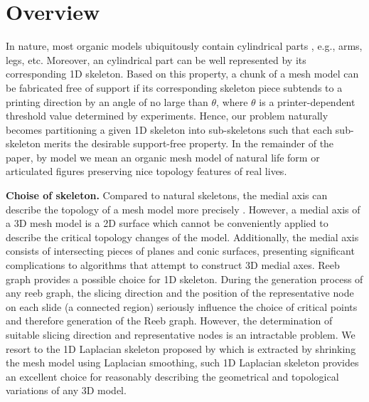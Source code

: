 \section{Overview}

In nature, most organic models ubiquitously contain cylindrical parts \cite{Zhou:2015:GCD}, e.g., arms, legs, etc. Moreover, an cylindrical part can be well represented by its corresponding 1D skeleton. Based on this property, a chunk of a mesh model can be fabricated free of support if its corresponding skeleton piece subtends to a printing direction by an angle of no large than $\theta$, where $\theta$ is a printer-dependent threshold value determined by experiments. Hence, our problem naturally becomes partitioning a given 1{D} skeleton into sub-skeletons such that each sub-skeleton merits the desirable support-free property. In the remainder of the paper, by model we mean an organic mesh model of natural life form or articulated figures preserving nice topology features of real lives.

\textbf{Choise of skeleton.} Compared to natural skeletons, the medial axis can describe the topology of a mesh model more precisely \cite{ZhangXWYTW15}. However, a medial axis of a 3D mesh model is a 2D surface which cannot be conveniently applied to describe the critical topology changes of the model. Additionally, the medial axis consists of intersecting pieces of planes and conic surfaces, presenting significant complications to algorithms that attempt to construct 3D medial axes.
Reeb graph provides a possible choice for 1D skeleton. During the generation process of any reeb graph, the slicing direction and the position of the representative node on each slide (a connected region) seriously influence the choice of critical points and therefore generation of the Reeb graph. However, the determination of suitable slicing direction and representative nodes is an intractable problem. We resort to the 1D Laplacian skeleton proposed by \cite{AuTCCL08} which is extracted by shrinking the mesh model using Laplacian smoothing, such 1D Laplacian skeleton provides an excellent choice for reasonably describing the geometrical and topological variations of any 3{D} model.





